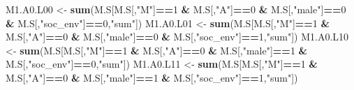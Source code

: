 \documentclass[
]{book}
\newenvironment{Shaded}{\begin{snugshade}}{\end{snugshade}}
\newcommand{\DecValTok}[1]{\textcolor[rgb]{0.00,0.00,0.81}{#1}}
\newcommand{\FunctionTok}[1]{\textcolor[rgb]{0.13,0.29,0.53}{\textbf{#1}}}
\newcommand{\NormalTok}[1]{#1}
\newcommand{\OtherTok}[1]{\textcolor[rgb]{0.56,0.35,0.01}{#1}}
\newcommand{\SpecialCharTok}[1]{\textcolor[rgb]{0.81,0.36,0.00}{\textbf{#1}}}
\newcommand{\StringTok}[1]{\textcolor[rgb]{0.31,0.60,0.02}{#1}}
\begin{document}
\begin{Shaded}
\begin{Highlighting}[]
\NormalTok{  M1.A0.L00 }\OtherTok{\textless{}{-}} \FunctionTok{sum}\NormalTok{(M.S[M.S[,}\StringTok{"M"}\NormalTok{]}\SpecialCharTok{==}\DecValTok{1} \SpecialCharTok{\&}\NormalTok{ M.S[,}\StringTok{"A"}\NormalTok{]}\SpecialCharTok{==}\DecValTok{0} \SpecialCharTok{\&}\NormalTok{ M.S[,}\StringTok{"male"}\NormalTok{]}\SpecialCharTok{==}\DecValTok{0} \SpecialCharTok{\&} 
\NormalTok{                         M.S[,}\StringTok{"soc\_env"}\NormalTok{]}\SpecialCharTok{==}\DecValTok{0}\NormalTok{,}\StringTok{"sum"}\NormalTok{])}
\NormalTok{  M1.A0.L01 }\OtherTok{\textless{}{-}} \FunctionTok{sum}\NormalTok{(M.S[M.S[,}\StringTok{"M"}\NormalTok{]}\SpecialCharTok{==}\DecValTok{1} \SpecialCharTok{\&}\NormalTok{ M.S[,}\StringTok{"A"}\NormalTok{]}\SpecialCharTok{==}\DecValTok{0} \SpecialCharTok{\&}\NormalTok{ M.S[,}\StringTok{"male"}\NormalTok{]}\SpecialCharTok{==}\DecValTok{0} \SpecialCharTok{\&} 
\NormalTok{                         M.S[,}\StringTok{"soc\_env"}\NormalTok{]}\SpecialCharTok{==}\DecValTok{1}\NormalTok{,}\StringTok{"sum"}\NormalTok{])}
\NormalTok{  M1.A0.L10 }\OtherTok{\textless{}{-}} \FunctionTok{sum}\NormalTok{(M.S[M.S[,}\StringTok{"M"}\NormalTok{]}\SpecialCharTok{==}\DecValTok{1} \SpecialCharTok{\&}\NormalTok{ M.S[,}\StringTok{"A"}\NormalTok{]}\SpecialCharTok{==}\DecValTok{0} \SpecialCharTok{\&}\NormalTok{ M.S[,}\StringTok{"male"}\NormalTok{]}\SpecialCharTok{==}\DecValTok{1} \SpecialCharTok{\&} 
\NormalTok{                         M.S[,}\StringTok{"soc\_env"}\NormalTok{]}\SpecialCharTok{==}\DecValTok{0}\NormalTok{,}\StringTok{"sum"}\NormalTok{])}
\NormalTok{  M1.A0.L11 }\OtherTok{\textless{}{-}} \FunctionTok{sum}\NormalTok{(M.S[M.S[,}\StringTok{"M"}\NormalTok{]}\SpecialCharTok{==}\DecValTok{1} \SpecialCharTok{\&}\NormalTok{ M.S[,}\StringTok{"A"}\NormalTok{]}\SpecialCharTok{==}\DecValTok{0} \SpecialCharTok{\&}\NormalTok{ M.S[,}\StringTok{"male"}\NormalTok{]}\SpecialCharTok{==}\DecValTok{1} \SpecialCharTok{\&} 
\NormalTok{                         M.S[,}\StringTok{"soc\_env"}\NormalTok{]}\SpecialCharTok{==}\DecValTok{1}\NormalTok{,}\StringTok{"sum"}\NormalTok{])}


\end{Highlighting}
\end{Shaded}
\end{document}
